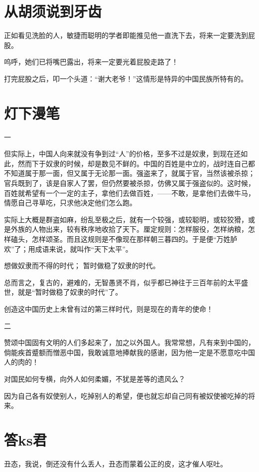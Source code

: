 \documentclass[a4paper]{ctexart}
\begin{document}
\begin{sloppy}
        \section{
            从胡须说到牙齿
        }
        

正如看见洗脸的人，敏捷而聪明的学者即能推见他一直洗下去，将来一定要洗到屁股。

呜呼，她们已将嘴巴露出，将来一定要光着屁股走路了！

打完屁股之后，叩一个头道：“谢大老爷！”这情形是特异的中国民族所特有的。

        \section{
            灯下漫笔
        }

一

但实际上，中国人向来就没有争到过“人”的价格，至多不过是奴隶，到现在还如此，然而下于奴隶的时候，却是数见不鲜的。中国的百姓是中立的，战时连自己都不知道属于那一面，但又属于无论那一面。强盗来了，就属于官，当然该被杀掠；官兵既到了，该是自家人了罢，但仍然要被杀掠，仿佛又属于强盗似的。这时候，百姓就希望有一个一定的主子，拿他们去做百姓，——不敢，是拿他们去做牛马，情愿自己寻草吃，只求他决定他们怎么跑。

实际上大概是群盗如麻，纷乱至极之后，就有一个较强，或较聪明，或较狡猾，或是外族的人物出来，较有秩序地收拾了天下。厘定规则：怎样服役，怎样纳粮，怎样磕头，怎样颂圣。而且这规则是不像现在那样朝三暮四的。于是便“万姓胪欢”了；用成语来说，就叫作“天下太平”。

想做奴隶而不得的时代；
暂时做稳了奴隶的时代。

总而言之，复古的，避难的，无智愚贤不肖，似乎都已神往于三百年前的太平盛世，就是“暂时做稳了奴隶的时代”了。

创造这中国历史上未曾有过的第三样时代，则是现在的青年的使命！


二

赞颂中国固有文明的人们多起来了，加之以外国人。我常常想，凡有来到中国的，倘能疾首蹙额而憎恶中国，我敢诚意地捧献我的感谢，因为他一定是不愿意吃中国人的肉的！

对国民如何专横，向外人如何柔媚，不犹是差等的遗风么？

因为自己各有奴使别人，吃掉别人的希望，便也就忘却自己同有被奴使被吃掉的将来。

        \section{
            答ks君
        }
        丑态，我说，倒还没有什么丢人，丑态而蒙着公正的皮，这才催人呕吐。
        
    \end{sloppy}
\end{document}
